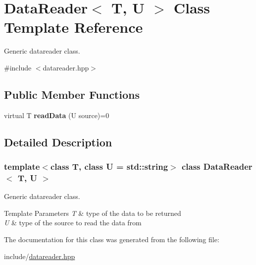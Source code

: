 \hypertarget{classDataReader}{}\section{Data\+Reader$<$ T, U $>$ Class Template Reference}
\label{classDataReader}


Generic datareader class.  




{\ttfamily \#include $<$datareader.\+hpp$>$}

\subsection*{Public Member Functions}
\begin{DoxyCompactItemize}
\item 
\mbox{\label{classDataReader_aeb6998fceb0145227afd8cc5ef65333b}} 
virtual T {\bfseries read\+Data} (U source)=0
\end{DoxyCompactItemize}


\subsection{Detailed Description}
\subsubsection*{template$<$class T, class U = std\+::string$>$\newline
class Data\+Reader$<$ T, U $>$}

Generic datareader class. 


\begin{DoxyTemplParams}{Template Parameters}
{\em T} & type of the data to be returned \\
\hline
{\em U} & type of the source to read the data from \\
\hline
\end{DoxyTemplParams}


The documentation for this class was generated from the following file\+:\begin{DoxyCompactItemize}
\item 
include/\hyperlink{datareader_8hpp}{datareader.\+hpp}\end{DoxyCompactItemize}
